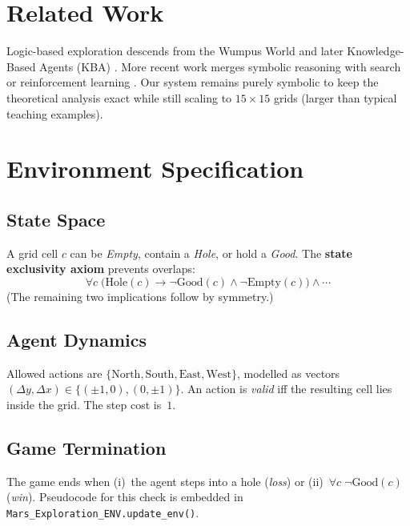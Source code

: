 \documentclass[12pt]{article}
\begin{document}
\section{Related Work}\label{sec:related}
Logic-based exploration descends from the Wumpus World and later
Knowledge-Based Agents (KBA) \cite{genesereth1994kbagents}.  
More recent work merges symbolic reasoning with search \cite{zhang2021hybrid}
or reinforcement learning \cite{kulkarni2016hierarchical}.
Our system remains purely symbolic to keep the theoretical analysis exact
while still scaling to \(15\times15\) grids (larger than typical teaching
examples).

\section{Environment Specification}\label{sec:environment}
\subsection{State Space}
A grid cell $c$ can be \emph{Empty}, contain a \emph{Hole}, or hold a
\emph{Good}.  The \textbf{state exclusivity axiom} prevents overlaps:
\begin{equation}
\forall c\; \bigl(\text{Hole}(c)\!\rightarrow\!\neg\text{Good}(c)\!\land\!\neg\text{Empty}(c)\bigr)
\land\cdots
\label{eq:exclusivity}
\end{equation}
(The remaining two implications follow by symmetry.)

\subsection{Agent Dynamics}
Allowed actions are $\{\text{North},\text{South},\text{East},\text{West}\}$,
modelled as vectors $(\Delta y,\Delta x)\in\{(\pm1,0),(0,\pm1)\}$.
An action is \emph{valid} iff the resulting cell lies inside the grid.  
The step cost is~$1$.

\subsection{Game Termination}
The game ends when
(i)~the agent steps into a hole (\emph{loss}) or
(ii)~\(\forall c\; \neg \text{Good}(c)\) (\emph{win}).
Pseudocode for this check is embedded in
\texttt{Mars\_Exploration\_ENV.update\_env()}.
\end{document}
